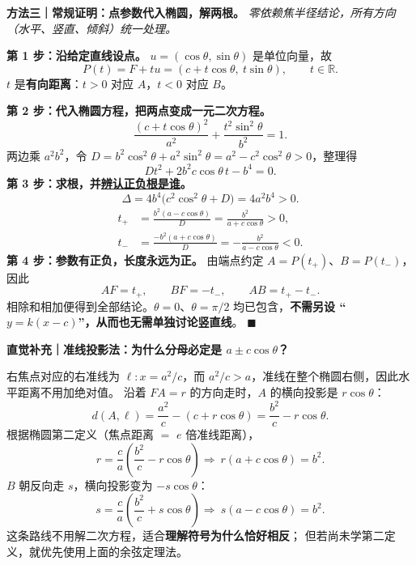\clearpage
\begin{proofbox}
\textbf{方法三｜常规证明：点参数代入椭圆，解两根。}\quad
\emph{零依赖焦半径结论，所有方向（水平、竖直、倾斜）统一处理。}
\par\smallskip\noindent
\textbf{第 1 步：沿给定直线设点。}
$u=(\cos\theta,\sin\theta)$ 是单位向量，故
\[
 P(t)=F+tu=(c+t\cos\theta,\ t\sin\theta),
\qquad t\in\mathbb R.
\]
$t$ 是\textbf{有向距离}：$t>0$ 对应 $A$，$t<0$ 对应 $B$。
\par\smallskip\noindent
\textbf{第 2 步：代入椭圆方程，把两点变成一元二次方程。}
\[
 \frac{(c+t\cos\theta)^2}{a^2}
 +\frac{t^2\sin^2\theta}{b^2}=1.
\]
两边乘 $a^2b^2$，令
$D=b^2\cos^2\theta+a^2\sin^2\theta
=a^2-c^2\cos^2\theta>0$，整理得
\[
 \boxed{Dt^2+2b^2c\cos\theta\,t-b^4=0}.
\]
\textbf{第 3 步：求根，并\underline{辨认正负根是谁}。}
\[
 \Delta=4b^4\bigl(c^2\cos^2\theta+D\bigr)=4a^2b^4>0.
\]
\[
 \begin{aligned}
 t_+&=\frac{b^2(a-c\cos\theta)}{D}
 =\frac{b^2}{a+c\cos\theta}>0,\\
 t_-&=\frac{-b^2(a+c\cos\theta)}{D}
 =-\frac{b^2}{a-c\cos\theta}<0.
 \end{aligned}
\]
\textbf{第 4 步：参数有正负，长度永远为正。}
由端点约定 $A=P(t_+)$、$B=P(t_-)$，因此
\[
 AF=t_+,\qquad BF=-t_-,\qquad AB=t_+-t_-.
\]
相除和相加便得到全部结论。$\theta=0$、$\theta=\pi/2$
均已包含，\textbf{不需另设 ``$y=k(x-c)$''，从而也无需单独讨论竖直线}。
\qquad$\blacksquare$
\end{proofbox}

\clearpage
\begin{proofbox}
\textbf{直觉补充｜准线投影法：为什么分母必定是 $a\pm c\cos\theta$？}
\par\smallskip\noindent
右焦点对应的右准线为 $\ell:x=a^2/c$，而
$a^2/c>a$，准线在整个椭圆右侧，因此水平距离不用加绝对值。
沿着 $FA=r$ 的方向走时，$A$ 的横向投影是 $r\cos\theta$：
\[
 d(A,\ell)=\frac{a^2}{c}-(c+r\cos\theta)
 =\frac{b^2}{c}-r\cos\theta.
\]
根据椭圆第二定义（焦点距离 $=$ $e$ 倍准线距离），
\[
 r=\frac ca\left(\frac{b^2}{c}-r\cos\theta\right)
 \Longrightarrow\ r(a+c\cos\theta)=b^2.
\]
$B$ 朝反向走 $s$，横向投影变为 $-s\cos\theta$：
\[
 s=\frac ca\left(\frac{b^2}{c}+s\cos\theta\right)
 \Longrightarrow\ s(a-c\cos\theta)=b^2.
\]
这条路线不用解二次方程，适合\textbf{理解符号为什么恰好相反}；
但若尚未学第二定义，就优先使用上面的余弦定理法。
\end{proofbox}
